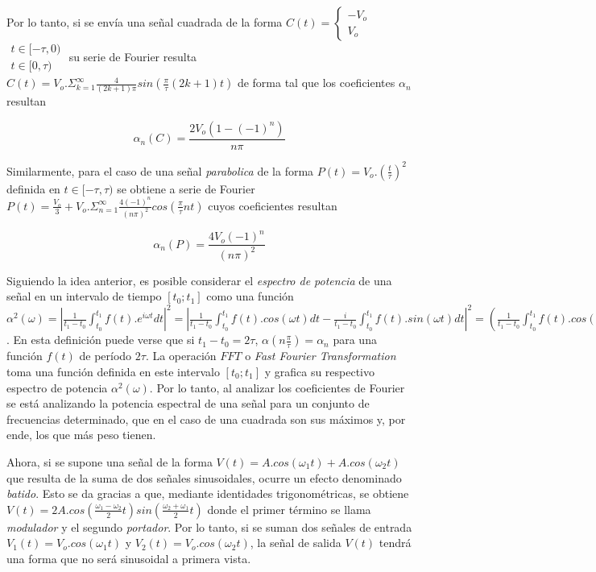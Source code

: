 \documentclass[11pt,a4paper]{article}
\begin{document}
Por lo tanto, si se envía una señal cuadrada de la forma $C(t)=
\left\{\begin{matrix}
-V_o \\ V_o
\end{matrix}\right.$
$\begin{matrix}
t\in[-\tau,0)\\ t\in[0,\tau)
\end{matrix}$
su serie de Fourier resulta $C(t) = V_o.\Sigma_{k=1}^{\infty} \frac{4}{(2k+1)\pi}sin(\frac{\pi}{\tau}(2k+1)t)$ de forma tal que los coeficientes $\alpha_n$ resultan

\begin{equation}
\alpha_n(C) = \frac{2V_o(1-(-1)^n)}{n\pi}
\label{eq:coef_cuad}
\end{equation}

Similarmente, para el caso de una señal \textit{parabolica} de la forma $P(t)=V_o.(\frac{t}{\tau})^2$ definida en $t\in[-\tau,\tau)$ se obtiene a serie de Fourier $P(t) = \frac{V_o}{3} + V_o.\Sigma_{n=1}^{\infty} \frac{4(-1)^n}{(n\pi)^2}cos(\frac{\pi}{\tau}nt)$ cuyos coeficientes resultan

\begin{equation}
\alpha_n(P) = \frac{4V_o(-1)^n}{(n\pi)^2}
\label{eq:coef_parab}
\end{equation}

Siguiendo la idea anterior, es posible considerar el \textit{espectro de potencia} de una señal en un intervalo de tiempo $[t_0;t_1]$ como una función $\alpha^2(\omega) = |\frac{1}{t_1-t_0}\int_{t_0}^{t_1} f(t).e^{i\omega t}dt|^2= |\frac{1}{t_1-t_0}\int_{t_0}^{t_1} f(t).cos(\omega t)dt - \frac{i}{t_1-t_0}\int_{t_0}^{t_1} f(t).sin(\omega t)dt|^2 = (\frac{1}{t_1-t_0}\int_{t_0}^{t_1} f(t).cos(\omega t)dt)^2+(\frac{1}{t_1-t_0}\int_{t_0}^{t_1} f(t).sin(\omega t)dt)^2$. En esta definición puede verse que si $t_1-t_0=2\tau$, $\alpha(n\frac{\pi}{\tau} )= \alpha_n$ para una función $f(t)$ de período $2\tau$. La operación $FFT$ o \textit{Fast Fourier Transformation} toma una función definida en este intervalo $[t_0;t_1]$ y grafica su respectivo espectro de potencia $\alpha^2(\omega)$. Por lo tanto, al analizar los coeficientes de Fourier se está analizando la potencia espectral de una señal para un conjunto de frecuencias determinado, que en el caso de una cuadrada son sus máximos y, por ende, los que más peso tienen. 


Ahora, si se supone una señal de la forma $V(t) = A.cos(\omega_1t) + A.cos(\omega_2t)$ que resulta de la suma de dos señales sinusoidales, ocurre un efecto denominado \textit{batido}. Esto se da gracias a que, mediante identidades trigonométricas, se obtiene $V(t) = 2A.cos(\frac{\omega_1-\omega_2}{2}t)sin(\frac{\omega_2+\omega_1}{2}t)$ donde el primer término se llama \textit{modulador} y el segundo \textit{portador}. Por lo tanto, si se suman dos señales de entrada 
$V_1(t) = V_o.cos(\omega_1t)$ y $V_2(t) = V_o.cos(\omega_2t)$, la señal de salida $V(t)$ tendrá una forma que no será sinusoidal a primera vista. 
\end{document}
